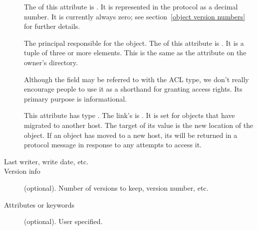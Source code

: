 \begin{description}
\item[] The  of this
attribute is .  It is represented in the protocol as a
decimal number.  It is currently always zero; see section~\ref{object
version numbers} for further details.

\item[] The principal responsible for the object.  The
 of this attribute is .  It is a tuple
of three or more elements.  This is the same as the 
attribute on the owner's  directory.

Although the  field may be referred to with the 
ACL type, we don't really encourage people to use it as a shorthand
for granting access rights.  Its primary purpose is informational.

\item[]  This attribute has type .
The link's  is .   It is set for objects that
have migrated to another host.  The target of its value is the new
location of the object.  If an object has moved to a new host,
its  will be returned in a 
protocol message in response to any attempts to access it.

\item[Last writer, write date, etc.] 

\item[Version info] (optional).  Number of versions to keep,
version number, etc. 

\item[Attributes or keywords] (optional).  User specified.


\end{description}

